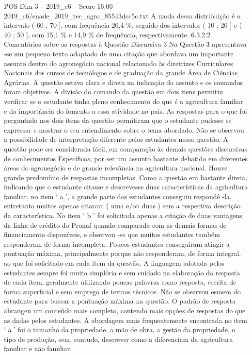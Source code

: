 \begin{textsample}{POS Dim 3 – 2019\_c6 – Score 16.00 – 2019\_c6/enade\_2019\_tec\_agro\_85543dcc5c.txt}
A moda dessa distribuição é o intervalo ( 60 ; 70 ], com frequência 20,4 \%, seguido dos intervalos ( 10 ; 20 ] e ( 40 ; 50 ], com 15,1 \% e 14,9 \% de frequência, respectivamente. 6.3.2.2 Comentários sobre as respostas à Questão Discursiva 3 Na Questão 3 apresentava -se um pequeno texto adaptado de uma citação que abordava um importante assunto dentro do agronegócio nacional relacionado às diretrizes Curriculares Nacionais dos cursos de tecnólogos e de graduação da grande Área de Ciências Agrárias.
A questão estava clara e direta na indicação do assunto e os comandos foram objetivos.
A divisão do comando da questão em dois itens permitiu verificar se o estudante tinha pleno conhecimento do que é a agricultura familiar e da importância do fomento a essa atividade no país.
As respostas para o que foi perguntado nos dois itens da questão permitiram que o estudante pudesse se expressar e mostrar o seu entendimento sobre o tema abordado.
Não se observou a possibilidade de interpretação diferente pelos estudantes nessa questão.
A questão pode ser considerada fácil, em comparação às demais questões discursivas de conhecimentos Específicos, por ser um assunto bastante debatido em diferentes áreas do agronegócio e de grande relevância na agricultura nacional.
Houve grande predomínio de respostas incompletas.
Como a questão era bastante direta, indicando que o estudante citasse e descrevesse duas características da agricultura familiar, no item ‘ a ’, a grande parte dos estudantes conseguiu respondê -la, entretanto muitos apenas citaram ( uma e/ou duas ) sem a respectiva descrição da característica.
No item ‘ b ’ foi solicitada apenas a citação de duas vantagens da linha de crédito do Pronaf quando comparada com as demais formas de financiamento disponíveis, e observou -se que muitos estudantes também responderam de forma incompleta.
Poucos estudantes conseguiram atingir a pontuação máxima, principalmente porque não responderam, de forma integral, ao que foi solicitado em cada item da questão.
A linguagem adotada pelos estudantes sempre foi muito simplória e sem cuidado na elaboração da resposta de cada item, geralmente utilizando poucas palavras como resposta, escrita de forma superficial e sem emprego de termos técnicos.
Não se observou esmero do estudante para buscar a pontuação máxima na questão.
O padrão de resposta abrangeu um conteúdo mais completo, contendo mais opções de respostas do que as dadas pelos estudantes.
A abordagem mais frequentemente encontrada no item ‘ a ’ foi o tamanho da propriedade, a mão de obra, a gestão da propriedade, o tipo de produção, sem, contudo, descrever como a diferenciam da agricultura familiar e não familiar.

\end{textsample}
